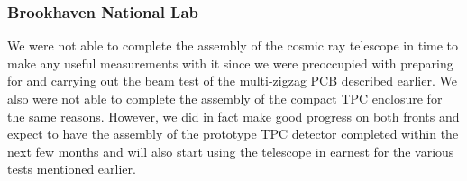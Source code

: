 \subsubsection{Brookhaven National Lab} 
We were not able to complete the assembly of the cosmic ray telescope in time to make any useful measurements with it since we were preoccupied with preparing for and carrying out the beam test of the multi-zigzag PCB described earlier. We also were not able to complete the assembly of the compact TPC enclosure for the same reasons. However, we did in fact make good progress on both fronts and expect to have the assembly of the prototype TPC detector completed within the next few months and will also start using the telescope in earnest for the various tests mentioned earlier.